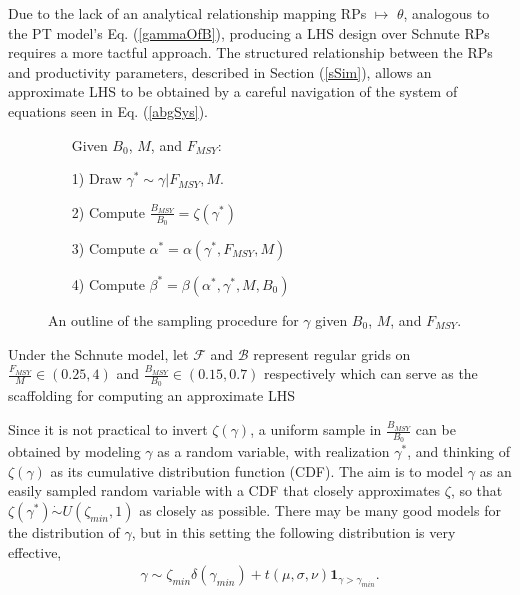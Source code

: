 \documentclass[12pt]{article}
\begin{document}
%




Due to the lack of an analytical relationship mapping RPs $\mapsto$ $\theta$, 
analogous to the PT model's Eq. (\ref{gammaOfB}), producing a LHS design 
over Schnute RPs requires a more tactful approach.
The structured relationship between the RPs and productivity parameters, 
described in Section (\ref{sSim}), allows an approximate LHS to be obtained by 
a careful navigation of the system of equations seen in Eq. (\ref{abgSys}).

%
\begin{figure}
\vspace{-0.5cm}
\begin{itemize}
        \item[] \hspace*{-1cm}Given $B_0$, $M$, and $F_{MSY}$:
        \item[1)] Draw $\gamma^* \sim \gamma|F_{MSY}, M$.
        \item[2)] Compute $\frac{B_{MSY}}{B_0} = \zeta(\gamma^*)$
        \item[3)] Compute $\alpha^* = \alpha(\gamma^*, F_{MSY}, M)$
        \item[4)] Compute $\beta^* = \beta(\alpha^*, \gamma^*, M, B_0)$
\end{itemize}
\vspace{-0.5cm}
\caption{ An outline of the sampling procedure for $\gamma$ 
given $B_0$, $M$, and $F_{MSY}$.
}
\end{figure}

%
Under the Schnute model, let $\mathcal{F}$ and $\mathcal{B}$ represent regular grids on
\mbox{$\frac{F_{MSY}}{M}\in(0.25, 4)$} and \mbox{$\frac{B_{MSY}}{B_0}\in(0.15, 0.7)$}
respectively which can serve as the scaffolding for computing an approximate LHS

%
Since it is not practical to invert $\zeta(\gamma)$, a uniform sample in 
$\frac{B_{MSY}}{B_0}$ can be obtained by modeling $\gamma$ as a random 
variable, with realization $\gamma^*$, and thinking of $\zeta(\gamma)$ as its 
cumulative distribution function (CDF). The aim is to model $\gamma$ as an 
easily sampled random variable with a CDF that closely approximates $\zeta$, so 
that $\zeta(\gamma^*)\dot\sim U(\zeta_{min},1)$ as closely as possible. There 
may be many good models for the distribution of $\gamma$, but in this setting 
the following distribution is very effective,
%
\begin{align}
\gamma \sim \zeta_{min}\delta(\gamma_{min}) + t(\mu, \sigma, \nu)\bm{1}_{\gamma>\gamma_{min}}. \label{mixT}
\end{align}
\end{document}
